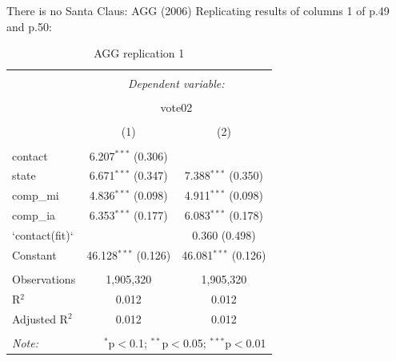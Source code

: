 \documentclass[
  ignorenonframetext,
]{beamer}
\newenvironment{Shaded}{\begin{snugshade}}{\end{snugshade}}
\newcommand{\AttributeTok}[1]{\textcolor[rgb]{0.77,0.63,0.00}{#1}}
\newcommand{\ConstantTok}[1]{\textcolor[rgb]{0.00,0.00,0.00}{#1}}
\newcommand{\FunctionTok}[1]{\textcolor[rgb]{0.00,0.00,0.00}{#1}}
\newcommand{\NormalTok}[1]{#1}
\newcommand{\SpecialCharTok}[1]{\textcolor[rgb]{0.00,0.00,0.00}{#1}}
\newcommand{\StringTok}[1]{\textcolor[rgb]{0.31,0.60,0.02}{#1}}
\begin{document}
\begin{frame}[fragile]{There is no Santa Claus: AGG (2006)}
\protect\hypertarget{there-is-no-santa-claus-agg-2006-2}{}
Replicating results of columns 1 of p.49 and p.50: \tiny

\begin{Shaded}
\end{Shaded}

\begin{table}[!htbp] \centering 
  \caption{AGG replication 1} 
  \label{} 
\begin{tabular}{@{\extracolsep{5pt}}lcc} 
\\[-1.8ex]\hline 
\hline \\[-1.8ex] 
 & \multicolumn{2}{c}{\textit{Dependent variable:}} \\ 
\cline{2-3} 
\\[-1.8ex] & \multicolumn{2}{c}{vote02} \\ 
\\[-1.8ex] & (1) & (2)\\ 
\hline \\[-1.8ex] 
 contact & 6.207$^{***}$ (0.306) &  \\ 
  state & 6.671$^{***}$ (0.347) & 7.388$^{***}$ (0.350) \\ 
  comp\_mi & 4.836$^{***}$ (0.098) & 4.911$^{***}$ (0.098) \\ 
  comp\_ia & 6.353$^{***}$ (0.177) & 6.083$^{***}$ (0.178) \\ 
  `contact(fit)` &  & 0.360 (0.498) \\ 
  Constant & 46.128$^{***}$ (0.126) & 46.081$^{***}$ (0.126) \\ 
 \hline \\[-1.8ex] 
Observations & 1,905,320 & 1,905,320 \\ 
R$^{2}$ & 0.012 & 0.012 \\ 
Adjusted R$^{2}$ & 0.012 & 0.012 \\ 
\hline 
\hline \\[-1.8ex] 
\textit{Note:}  & \multicolumn{2}{r}{$^{*}$p$<$0.1; $^{**}$p$<$0.05; $^{***}$p$<$0.01} \\ 
\end{tabular} 
\end{table}
\end{frame}
\end{document}
